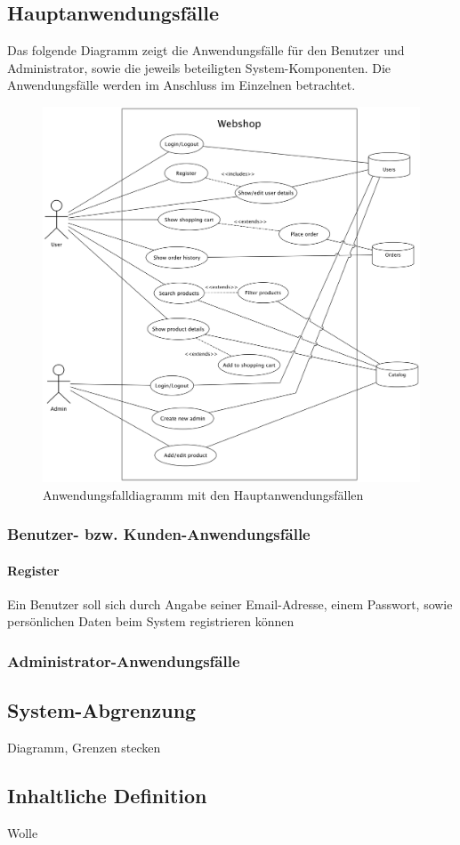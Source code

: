 \subsection{Hauptanwendungsfälle}\label{usecases}
Das folgende Diagramm zeigt die Anwendungsfälle für den Benutzer und Administrator, sowie die jeweils beteiligten System-Komponenten.
Die Anwendungsfälle werden im Anschluss im Einzelnen betrachtet.
\begin{figure}[ht!]
	\centering
	\includegraphics[width=\linewidth]{bilder/kap4/use_cases}
	\caption{Anwendungsfalldiagramm mit den Hauptanwendungsfällen}
	\label{fig:usecases}
\end{figure}

\subsubsection{Benutzer- bzw. Kunden-Anwendungsfälle}
\paragraph{Register}
Ein Benutzer soll sich durch Angabe seiner Email-Adresse, einem Passwort, sowie persönlichen Daten beim System registrieren können


\subsubsection{Administrator-Anwendungsfälle}
\subsection{System-Abgrenzung}
Diagramm, Grenzen stecken
\subsection{Inhaltliche Definition}
Wolle